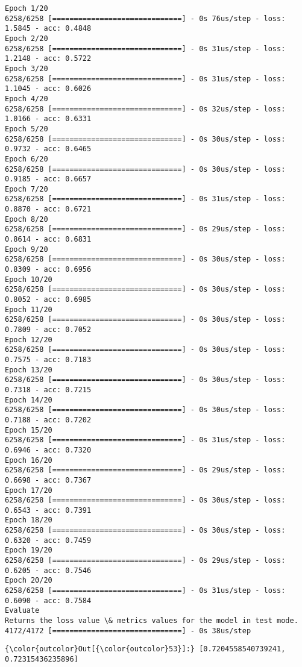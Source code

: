 \documentclass[11pt]{article}
\begin{document}
    \begin{Verbatim}[commandchars=\\\{\}]
Epoch 1/20
6258/6258 [==============================] - 0s 76us/step - loss: 1.5845 - acc: 0.4848
Epoch 2/20
6258/6258 [==============================] - 0s 31us/step - loss: 1.2148 - acc: 0.5722
Epoch 3/20
6258/6258 [==============================] - 0s 31us/step - loss: 1.1045 - acc: 0.6026
Epoch 4/20
6258/6258 [==============================] - 0s 32us/step - loss: 1.0166 - acc: 0.6331
Epoch 5/20
6258/6258 [==============================] - 0s 30us/step - loss: 0.9732 - acc: 0.6465
Epoch 6/20
6258/6258 [==============================] - 0s 30us/step - loss: 0.9185 - acc: 0.6657
Epoch 7/20
6258/6258 [==============================] - 0s 31us/step - loss: 0.8870 - acc: 0.6721
Epoch 8/20
6258/6258 [==============================] - 0s 29us/step - loss: 0.8614 - acc: 0.6831
Epoch 9/20
6258/6258 [==============================] - 0s 30us/step - loss: 0.8309 - acc: 0.6956
Epoch 10/20
6258/6258 [==============================] - 0s 30us/step - loss: 0.8052 - acc: 0.6985
Epoch 11/20
6258/6258 [==============================] - 0s 30us/step - loss: 0.7809 - acc: 0.7052
Epoch 12/20
6258/6258 [==============================] - 0s 30us/step - loss: 0.7575 - acc: 0.7183
Epoch 13/20
6258/6258 [==============================] - 0s 30us/step - loss: 0.7318 - acc: 0.7215
Epoch 14/20
6258/6258 [==============================] - 0s 30us/step - loss: 0.7188 - acc: 0.7202
Epoch 15/20
6258/6258 [==============================] - 0s 31us/step - loss: 0.6946 - acc: 0.7320
Epoch 16/20
6258/6258 [==============================] - 0s 29us/step - loss: 0.6698 - acc: 0.7367
Epoch 17/20
6258/6258 [==============================] - 0s 30us/step - loss: 0.6543 - acc: 0.7391
Epoch 18/20
6258/6258 [==============================] - 0s 30us/step - loss: 0.6320 - acc: 0.7459
Epoch 19/20
6258/6258 [==============================] - 0s 29us/step - loss: 0.6205 - acc: 0.7546
Epoch 20/20
6258/6258 [==============================] - 0s 31us/step - loss: 0.6090 - acc: 0.7584
Evaluate
Returns the loss value \& metrics values for the model in test mode.
4172/4172 [==============================] - 0s 38us/step

    \end{Verbatim}

\begin{Verbatim}[commandchars=\\\{\}]
{\color{outcolor}Out[{\color{outcolor}53}]:} [0.7204558540739241, 0.72315436235896]
\end{Verbatim}
            

    
    
    
    
\end{document}
